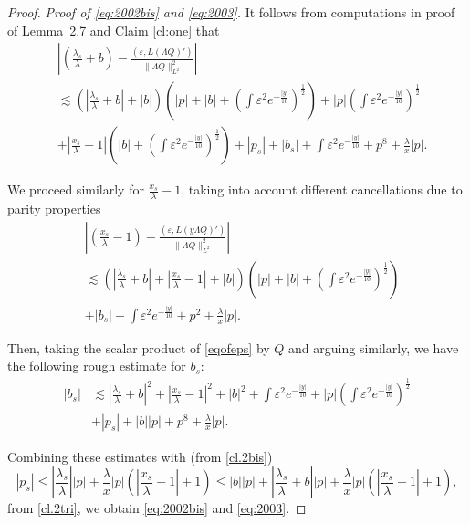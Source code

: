 \documentclass[11pt,a4paper,reqno]{amsart}
\theoremstyle{remark}
\numberwithin{equation}{section}
\def\e{\varepsilon}
\def\lsl{\frac{\lambda_s}{\lambda}}
\def\l{\lambda}
\def\lsl{\frac{\lambda_s}{\lambda}}
\def\xsl{\frac{x_s}{\lambda}}
\begin{document}
\begin{proof}
\emph{Proof of   \eqref{eq:2002bis} and \eqref{eq:2003}.} 
It follows from computations in \cite{MMR1} proof of Lemma~2.7 and Claim \ref{cl:one} that
\begin{align*}
& \left| \left( {\frac{{\lambda}_s}{{\lambda}}} + {b} \right) -  \frac {( \e,L(\Lambda Q)')}{\|\Lambda Q\|_{L^2}^2}  \right|  
 \\ & \lesssim 
 \left( \left|  {\frac{{\lambda}_s}{{\lambda}}}+ {b}  \right|  +|b|\right)\left(|p|+ |b|  + \left( \int \varepsilon^2 {e^{-\frac{|y|}{10}}} \right)^{\frac 12} \right)  + |p| \left( \int \varepsilon^2 {e^{-\frac{|y|}{10}}} \right)^{\frac 12} \\
 & + \left| {\frac{x_s}{{\lambda}}} - 1 \right| \left(  |b|  + \left( \int \varepsilon^2 {e^{-\frac{|y|}{10}}} \right)^{\frac 12} \right)
 +|p_s|+|{b}_{s}|+\int \varepsilon^2 e^{-\frac{|y|}{10}} + p^8    +
 \frac {\l}{x} |p|   .
\end{align*}

We proceed similarly for $\xsl-1$, taking into account different cancellations due to parity properties \begin{align*}
&  \left|\left( {\frac{x_s}{{\lambda}}} - 1  \right) - \frac {( \e,L(y \Lambda Q)')}{\|\Lambda Q\|_{L^2}^2}  \right|
 \\ & \lesssim 
 \left( \left|  {\frac{{\lambda}_s}{{\lambda}}}+ {b}  \right| + \left| {\frac{x_s}{{\lambda}}} - 1 \right|  +|b|\right)\left(|p|+|b|  + \left( \int \varepsilon^2 {e^{-\frac{|y|}{10}}} \right)^{\frac 12} \right) 
 \\ &+|{b}_{s}|+\int \varepsilon^2 e^{-\frac{|y|}{10}} 
   +p^2 +\frac \l x |p|.
\end{align*}
 
Then, taking the scalar product of \eqref{eqofeps} by $Q$ and arguing similarly, we have the following 
rough estimate for $b_s$:
\begin{align*}
|{b}_{s}| &\lesssim  \left| {\frac{{\lambda}_s}{{\lambda}}} + {b}\right|^2 + \left| {\frac{x_s}{{\lambda}}} - 1 \right|^2 +  {|b|}^2 +  \int   \varepsilon^2   {e^{-\frac{|y|}{10}}} 
+ |p| \left( \int \varepsilon^2 {e^{-\frac{|y|}{10}}} \right)^{\frac 12}
\\ &+|p_s| + |b| |p| +p^8
 +\frac \l x |p| .
\end{align*}

Combining these estimates with (from \eqref{cl.2bis})
$$
|p_s| \leq \left|   \lsl \right| |p| + \frac {\l}{x}  |p|\left( \left|\xsl - 1\right| + 1 \right)
\leq |b| |p| +\left| \lsl+b\right| |p| +  \frac \l x |p|\left( \left|\xsl - 1\right| + 1 \right),
$$
from \eqref{cl.2tri},
we obtain  \eqref{eq:2002bis} and \eqref{eq:2003}. 


\end{proof}
\end{document}
